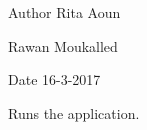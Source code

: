 \begin{DoxyAuthor}{\-Author}
\-Rita \-Aoun 

\-Rawan \-Moukalled 
\end{DoxyAuthor}
\begin{DoxyDate}{\-Date}
16-\/3-\/2017
\end{DoxyDate}
\-Runs the application. 